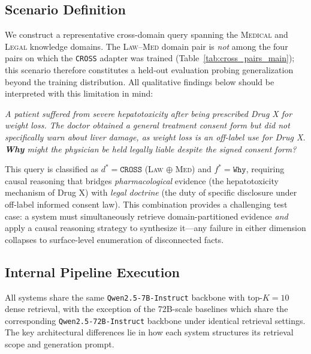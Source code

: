 \documentclass[a4paper,fleql,doubleblind]{cas-sc}
\begin{document}
\subsection{Scenario Definition}
\label{ssec:scenario}
We construct a representative cross-domain query spanning the \textsc{Medical}
and \textsc{Legal} knowledge domains. The \textsc{Law}--\textsc{Med} domain
pair is \emph{not} among the four pairs on which the \texttt{CROSS} adapter
was trained (Table~\ref{tab:cross_pairs_main}); this scenario therefore
constitutes a held-out evaluation probing generalization beyond the training
distribution. All qualitative findings below should be interpreted with this
limitation in mind:
\vspace{4pt}
\begin{tcolorbox}[colback=gray!8, colframe=gray!40, arc=2pt,
  boxrule=0.5pt, left=6pt, right=6pt, top=4pt, bottom=4pt]
\small\itshape
A patient suffered from severe hepatotoxicity after being prescribed Drug X
for weight loss. The doctor obtained a general treatment consent form but did
not specifically warn about liver damage, as weight loss is an off-label use
for Drug X. \textbf{Why} might the physician be held legally liable despite
the signed consent form?
\end{tcolorbox}
\vspace{4pt}
\noindent
This query is classified as $d^* = \texttt{CROSS}$ (\textsc{Law} $\oplus$
\textsc{Med}) and $f^* = \texttt{Why}$, requiring causal reasoning that bridges
\textit{pharmacological} evidence (the hepatotoxicity mechanism of Drug X) with
\textit{legal doctrine} (the duty of specific disclosure under off-label
informed consent law). This combination provides a challenging test case: a
system must simultaneously retrieve domain-partitioned evidence \emph{and}
apply a causal reasoning strategy to synthesize it---any failure in either
dimension collapses to surface-level enumeration of disconnected facts.

\subsection{Internal Pipeline Execution}
\label{ssec:pipeline}
All systems share the same \texttt{Qwen2.5-7B-Instruct} backbone with
top-$K{=}10$ dense retrieval, with the exception of the 72B-scale baselines
which share the corresponding \texttt{Qwen2.5-72B-Instruct} backbone under
identical retrieval settings. The key architectural differences lie in how
each system structures its retrieval scope and generation prompt.
\end{document}
